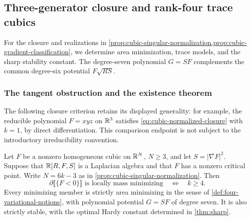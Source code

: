\subsection{Three-generator closure and rank-four trace cubics}
\label{sec:gradient-square-rank-two}

For the closure and realizations in
\cref{prop:cubic-singular-normalization,prop:cubic-gradient-classification},
we determine area minimization, trace models, and the sharp stability
constant. The degree-seven polynomial $G=SF$ complements the common
degree-six potential $F\sqrt{RS}$.

\subsubsection{The tangent obstruction and the existence theorem}

The following closure criterion retains its displayed generality:
for example, the reducible polynomial \(F=xyz\) on \(\mathbb R^3\)
satisfies \eqref{eq:cubic-normalized-closure} with \(k=1\), by
direct differentiation. This comparison endpoint is not subject to
the introductory irreducibility convention.

\begin{theorem}
\label{thm:cubic-rank-two-existence}
Let \(F\) be a nonzero homogeneous cubic on \(\mathbb R^N\), \(N\geq3\),
and let \(S=|\nabla F|^2\).  Suppose that
\(\mathbb R[R,F,S]\) is a Laplacian algebra and that \(F\) has a
nonzero critical point.  Write \(N=6k-3\) as in
\cref{prop:cubic-singular-normalization}.  Then
\begin{equation}\label{eq:cubic-minimality-threshold}
 \partial\llbracket\{F<0\}\rrbracket\text{ is locally mass minimizing}
 \quad\Longleftrightarrow\quad k\geq4.
\end{equation}
Every minimizing member is strictly area minimizing in the sense of
\cref{def:four-variational-notions}, with polynomial potential
\(G=SF\) of degree seven. It is also strictly stable, with the
optimal Hardy constant determined in \cref{thm:sharp}.
\end{theorem}

